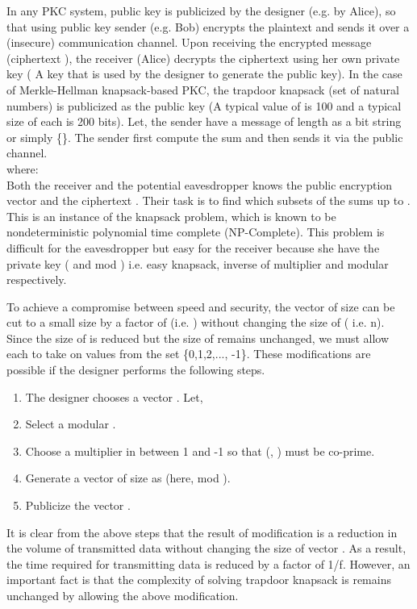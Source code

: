 \documentclass[5p,times,twocolumn]{elsarticle}
\begin{document}
In any PKC system, public key is publicized by the designer (e.g. by Alice), so that using public key sender (e.g. Bob) encrypts the plaintext and sends it over a  (insecure) communication  channel. Upon receiving the encrypted message (ciphertext ), the receiver (Alice) decrypts the ciphertext  using her own private key ( A key that is used by the designer to generate the public key). In the case of Merkle-Hellman knapsack-based PKC, the trapdoor knapsack  (set of natural numbers) is publicized as the public key (A typical value of  is 100 and a typical size of each  is 200 bits). Let, the sender have a message of length  as a bit string or simply  \{\}. The sender first compute the sum  and then sends it via the public channel. \\

where: \\

Both the receiver and the potential eavesdropper knows the public encryption vector  and the ciphertext . Their task is to find which subsets of the   sums up to . This is an instance of the knapsack problem, which is known to be nondeterministic polynomial time complete (NP-Complete). This problem is difficult for the eavesdropper but easy for the receiver because she have the private key ( and mod ) i.e. easy knapsack, inverse of multiplier and modular  respectively.  

To achieve a compromise between speed and security, the vector  of size  can be cut to a small size by a factor of  (i.e. ) without changing the size of  ( i.e. n). Since the size of  is reduced but the size of  remains unchanged, we must allow each  to take on values from the set \{0,1,2,..., -1\}. These modifications are possible if the designer performs the following steps.\\

\begin{enumerate}
  	\item The designer chooses a  vector . Let, 
	\item Select a modular  .	
	\item Choose a multiplier  in between 1 and -1 so that (, ) must be co-prime.
	\item Generate a vector  of size  as  (here,  mod  ).
	\item Publicize the vector .	
\end{enumerate}

It is clear from the above steps that the result of modification is a reduction in the volume of transmitted data without changing the size of vector . As a result, the time required for transmitting data is reduced by a factor of 1/f. However, an important fact is that the complexity of solving trapdoor knapsack  is remains unchanged by allowing the above modification.
\end{document}
